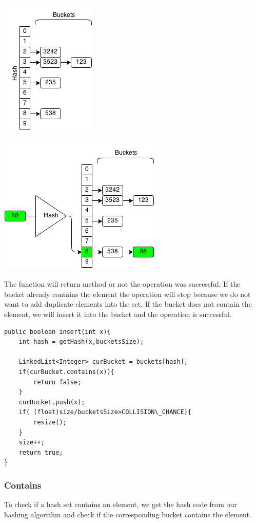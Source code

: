 \documentclass[11pt,oneside]{book}
\makeatletter
\def\maxwidth#1{\ifdim\Gin@nat@width>#1 #1\else\Gin@nat@width\fi}
\makeatother
\begin{document}
\includegraphics[width=\maxwidth{\textwidth}]{hashset.png}

\includegraphics[width=\maxwidth{\textwidth}]{hashsetinsert.png}

The function will return method or not the operation was successful. If the bucket already contains the element the operation will stop because we do not want to add duplicate elements into the set. If the bucket does not contain the element, we will insert it into the bucket and the operation is successful.

\begin{lstlisting}
public boolean insert(int x){
    int hash = getHash(x,bucketsSize);
        
    LinkedList<Integer> curBucket = buckets[hash];
    if(curBucket.contains(x)){
        return false;
    }
    curBucket.push(x);
    if( (float)size/bucketsSize>COLLISION\_CHANCE){
        resize();
    }
    size++;
    return true;
}
\end{lstlisting}

\subsubsection{Contains}

To check if a hash set contains an element, we get the hash code from our hashing algorithm and check if the corresponding bucket contains the element.
\end{document}

